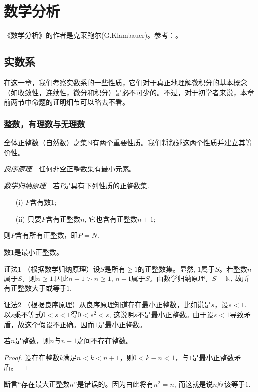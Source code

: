 \part{数学分析}
《数学分析》的作者是克莱鲍尔(G.Klambauer)。参考：\cite{MathematicalAnalysisKlambauer1981}。

\chapter{实数系}\label{ch01001}
在这一章，我们考察实数系的一些性质，它们对于真正地理解微积分的基本概念（如收敛性，连续性，微分和积分）是必不可少的。不过，对于初学者来说，本章前两节中命题的证明细节可以略去不看。

\section{整数，有理数与无理数}\label{sec0100101}
全体正整数（自然数）之集$\mathbb{N}$有两个重要性质。我们将叙述这两个性质并建立其等价性。

\emph{良序原理}\ \ 任何非空正整数集有最小元素。

\emph{数学归纳原理}\ \ 若$P$是具有下列性质的正整数集.
\begin{enumerate}
\item[(i)] $P$含有数$1$;
\item[(ii)] 只要$P$含有正整数$n$, 它也含有正整数$n+1$;
\end{enumerate}
则$P$含有所有正整数，即$P = N$.

\begin{proposition}{}{}
数$1$是最小正整数。
\end{proposition}

证法1 （根据数学归纳原理）设$S$是所有$\ge 1$的正整数集。显然, $1$属于$S$。若整数$n$属于$S$，则$n \ge 1$.因此$n+1 > n \ge 1$, $n+1$属于$S$。由数学归纳原理，$S=\mathbb{N}$, 故所有正整数大于或等于$1$.

证法2 （根据良序原理）从良序原理知道存在最小正整数，比如说是$s$，设$s < 1$. 以$s$乘不等式$0 < s < 1$得$0 < s^2 < s$, 这说明$s$不是最小正整数。由于设$s < 1$导致矛盾，故这个假设不正确。因而$1$是最小正整数。

\begin{corollary}{}{}
若$n$是整数，则$n$与$n+1$之间不存在整数。
\end{corollary}
\begin{proof}
设存在整数$k$满足$n < k < n+1$，则$0 < k-n< 1$，与$1$是最小正整数矛盾。
\end{proof}

\begin{remark}
断言“存在最大正整数$n$”是错误的。因为由此将有$n^2=n$, 而这就是说$n$应该等于$1$.
\end{remark}

